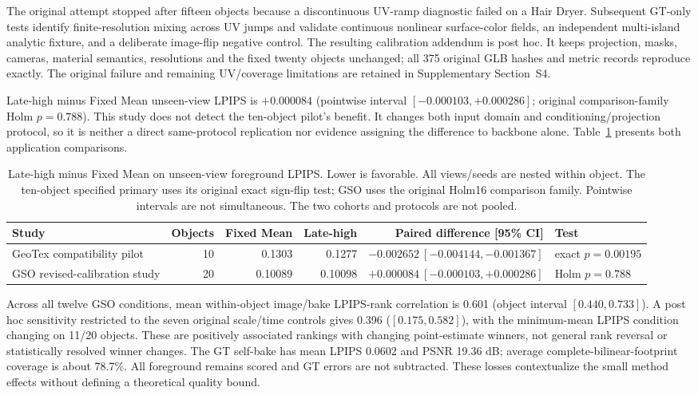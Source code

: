 \documentclass[times,twocolumn,final]{elsarticle}
\begin{document}
The original attempt stopped after fifteen objects because a discontinuous UV-ramp diagnostic failed on a Hair Dryer. Subsequent GT-only tests identify finite-resolution mixing across UV jumps and validate continuous nonlinear surface-color fields, an independent multi-island analytic fixture, and a deliberate image-flip negative control. The resulting calibration addendum is post hoc. It keeps projection, masks, cameras, material semantics, resolutions and the fixed twenty objects unchanged; all 375 original GLB hashes and metric records reproduce exactly. The original failure and remaining UV/coverage limitations are retained in Supplementary Section~S4.

Late-high minus Fixed Mean unseen-view LPIPS is $+0.000084$ (pointwise interval $[-0.000103,+0.000286]$; original comparison-family Holm $p=0.788$). This study does not detect the ten-object pilot's benefit. It changes both input domain and conditioning/projection protocol, so it is neither a direct same-protocol replication nor evidence assigning the difference to backbone alone. Table~\ref{tab:bake-cohorts} presents both application comparisons.

\begin{table}[t]\centering\scriptsize\setlength{\tabcolsep}{4pt}
\caption{Late-high minus Fixed Mean on unseen-view foreground LPIPS. Lower is favorable. All views/seeds are nested within object. The ten-object specified primary uses its original exact sign-flip test; GSO uses the original Holm16 comparison family. Pointwise intervals are not simultaneous. The two cohorts and protocols are not pooled.}
\label{tab:bake-cohorts}
\begin{tabular}{lrrrrl}
\toprule Study & Objects & Fixed Mean & Late-high & Paired difference [95\% CI] & Test \\
\midrule
GeoTex compatibility pilot & 10 & 0.1303 & 0.1277 & $-0.002652\ [-0.004144,-0.001367]$ & exact $p=0.00195$ \\
GSO revised-calibration study & 20 & 0.10089 & 0.10098 & $+0.000084\ [-0.000103,+0.000286]$ & Holm $p=0.788$ \\
\bottomrule\end{tabular}\end{table}

Across all twelve GSO conditions, mean within-object image/bake LPIPS-rank correlation is 0.601 (object interval $[0.440,0.733]$). A post hoc sensitivity restricted to the seven original scale/time controls gives 0.396 ($[0.175,0.582]$), with the minimum-mean LPIPS condition changing on 11/20 objects. These are positively associated rankings with changing point-estimate winners, not general rank reversal or statistically resolved winner changes. The GT self-bake has mean LPIPS 0.0602 and PSNR 19.36 dB; average complete-bilinear-footprint coverage is about 78.7\%. All foreground remains scored and GT errors are not subtracted. These losses contextualize the small method effects without defining a theoretical quality bound.
\end{document}

